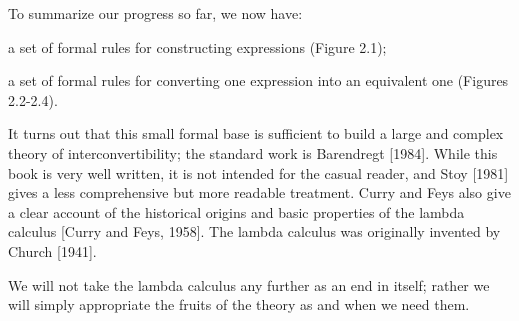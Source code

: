 To summarize our progress so far, we now have:
\begin{numbered}
    \item a set of formal rules for constructing expressions (Figure 2.1);
    \item a set of formal rules for converting one expression into an equivalent one
    (Figures 2.2-2.4).
\end{numbered}
It turns out that this small formal base is sufficient to build a large and complex theory of interconvertibility; the standard work is Barendregt [1984]. While this book is very well written, it is not intended for the casual reader, and Stoy [1981] gives a less comprehensive but more readable treatment. Curry and Feys also give a clear account of the historical origins and basic properties of the lambda calculus [Curry and Feys, 1958]. The lambda calculus was originally invented by Church [1941].

We will not take the lambda calculus any further as an end in itself; rather we will simply appropriate the fruits of the theory as and when we need them.

